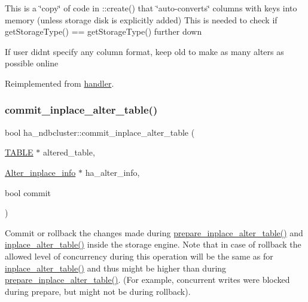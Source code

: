 This is a \char`\"{}copy\char`\"{} of code in \+::create() that \char`\"{}auto-\/converts\char`\"{} columns with keys into memory (unless storage disk is explicitly added) This is needed to check if get\+Storage\+Type() == get\+Storage\+Type() further down

If user didn\textquotesingle{}t specify any column format, keep old to make as many alter\textquotesingle{}s as possible online

Reimplemented from \mbox{\hyperlink{classhandler_a67890a9deb89b9ef0128601e7687fcba}{handler}}.

\mbox{\label{classha__ndbcluster_af55db4a0efc9c99947b72b4bfc83b8ad}} 
\subsubsection{\texorpdfstring{commit\+\_\+inplace\+\_\+alter\+\_\+table()}{commit\_inplace\_alter\_table()}}
{\footnotesize\ttfamily bool ha\+\_\+ndbcluster\+::commit\+\_\+inplace\+\_\+alter\+\_\+table (\begin{DoxyParamCaption}\item[{\mbox{\hyperlink{structTABLE}{T\+A\+B\+LE}} $\ast$}]{altered\+\_\+table,  }\item[{\mbox{\hyperlink{classAlter__inplace__info}{Alter\+\_\+inplace\+\_\+info}} $\ast$}]{ha\+\_\+alter\+\_\+info,  }\item[{bool}]{commit }\end{DoxyParamCaption})\hspace{0.3cm}{\ttfamily [virtual]}}

Commit or rollback the changes made during \mbox{\hyperlink{classha__ndbcluster_a3d7235ae7ee13ad3a572af0fd5c15291}{prepare\+\_\+inplace\+\_\+alter\+\_\+table()}} and \mbox{\hyperlink{classha__ndbcluster_a5ff1e368997d6822e3285080fade11fe}{inplace\+\_\+alter\+\_\+table()}} inside the storage engine. Note that in case of rollback the allowed level of concurrency during this operation will be the same as for \mbox{\hyperlink{classha__ndbcluster_a5ff1e368997d6822e3285080fade11fe}{inplace\+\_\+alter\+\_\+table()}} and thus might be higher than during \mbox{\hyperlink{classha__ndbcluster_a3d7235ae7ee13ad3a572af0fd5c15291}{prepare\+\_\+inplace\+\_\+alter\+\_\+table()}}. (For example, concurrent writes were blocked during prepare, but might not be during rollback).

